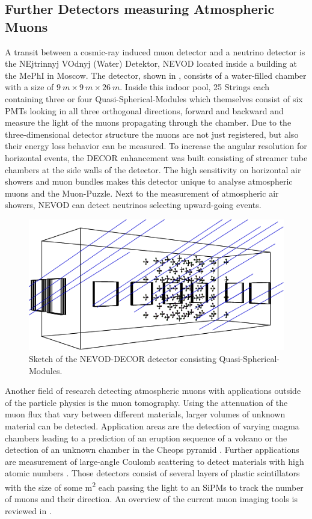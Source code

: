 \subsection{Further Detectors measuring Atmospheric Muons}

A transit between a cosmic-ray induced muon detector and a neutrino detector is the NEjtrinnyj VOdnyj (Water) Detektor, NEVOD \cite{NEVOD15} located inside a building  at the MePhI in Moscow.
The detector, shown in , consists of a water-filled chamber with a size of $\SI{9}{m} \times \SI{9}{m} \times \SI{26}{m}$.
Inside this indoor pool, 25 Strings each containing three or four Quasi-Spherical-Modules which themselves consist of six PMTs looking in all three orthogonal directions, forward and backward and measure the light of the muons propagating through the chamber.
Due to the three-dimensional detector structure the muons are not just registered, but also their energy loss behavior can be measured.
To increase the angular resolution for horizontal events, the DECOR enhancement was built consisting of streamer tube chambers at the side walls of the detector.
The high sensitivity on horizontal air showers and muon bundles makes this detector unique to analyse atmospheric muons and the Muon-Puzzle.
Next to the measurement of atmospheric air showers, NEVOD can detect neutrinos selecting upward-going events.
\begin{figure}
    \centering
    \includegraphics[width=\textwidth]{./images/detector_nevod.pdf}
    \caption{Sketch of the NEVOD-DECOR detector consisting Quasi-Spherical-Modules. \cite{NEVOD18}}
    \label{fig:detect_nevod}
\end{figure}

Another field of research detecting atmospheric muons with applications outside of the particle physics is the muon tomography.
Using the attenuation of the muon flux that vary between different materials, larger volumes of unknown material can be detected.
Application areas are the detection of varying magma chambers leading to a prediction of an eruption sequence of a volcano \cite{Tanaka09} or the detection of an unknown chamber in the Cheops pyramid \cite{Morishima17}.
Further applications are measurement of large-angle Coulomb scattering to detect materials with high atomic numbers \cite{Borozdin03}.
Those detectors consist of several layers of plastic scintillators with the size of some \si{m^2} each passing the light to an SiPMs to track the number of muons and their direction.
An overview of the current muon imaging tools is reviewed in \cite{Bonechi19}.

